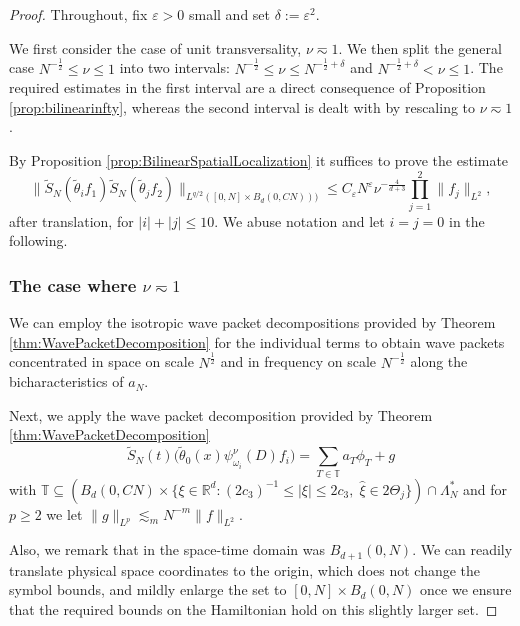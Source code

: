 \documentclass{amsart}
\numberwithin{equation}{section}
\theoremstyle{definition}
\newcommand{\R}{\mathbb{R}}
\newcommand{\T}{\mathbb{T}}
\newcommand {\veps}{\varepsilon}
\begin{document}
\begin{proof}
Throughout, fix $\veps>0$ small and set $\delta:=\veps^{2}$. 

We first consider the case of unit transversality, $\nu\eqsim 1$. We then split the general case $N^{-\frac{1}{2}}\leq \nu\leq 1$ into two intervals: $N^{-\frac{1}{2}}\leq \nu\leq N^{-\frac{1}{2}+\delta}$ and $N^{-\frac{1}{2}+\delta}<\nu\leq 1$. The required estimates in the first interval are a direct consequence of Proposition \ref{prop:bilinearinfty}, whereas the second interval is dealt with by rescaling to $\nu\eqsim 1$.

By Proposition \ref{prop:BilinearSpatialLocalization} it suffices to prove the estimate
\begin{equation*}
    \| \tilde{S}_N (\tilde{\theta}_i f_1) \tilde{S}_N (\tilde{\theta}_j f_2) \|_{L^{q/2}([0,N] \times B_d(0,CN)))} \leq C_\varepsilon N^{\varepsilon} \nu^{-\frac{4}{d+3}} \prod_{j=1}^2 \| f_j \|_{L^2},
\end{equation*}
after translation, for $|i|+|j| \leq 10$. We abuse notation and let $i=j=0$ in the following.

\subsubsection*{The case where $\nu \eqsim 1$} 
We can employ the isotropic wave packet decompositions provided by Theorem \ref{thm:WavePacketDecomposition} for the individual terms to obtain wave packets concentrated in space on scale $N^{\frac{1}{2}}$ and in frequency on scale $N^{-\frac{1}{2}}$ along the bicharacteristics of $a_N$.

Next, we apply the wave packet decomposition provided by Theorem \ref{thm:WavePacketDecomposition}
\begin{equation*}
\tilde{S}_N(t) \big( \tilde{\theta}_0(x) \psi^{\nu}_{\omega_{i}}(D) f_i \big) = \sum_{T \in \T} a_T \phi_T + g
\end{equation*}
with $\T \subseteq ( B_d(0,CN) \times \{ \xi \in \R^d: (2c_{3})^{-1}\leq |\xi|\leq 2c_{3}, \; \hat{\xi}\in 2\Theta_{j} \} ) \cap \Lambda_N^*$ and for $p \geq 2$ we let $\| g \|_{L^p} \lesssim_m N^{-m} \| f \|_{L^2}$.

Also, we remark that in \cite{SchippaTataru2025} the space-time domain was $B_{d+1}(0,N)$. We can readily translate physical space coordinates to the origin, which does not change the symbol bounds, and mildly enlarge the set to $[0,N] \times B_d(0,N)$ once we ensure that the required bounds on the Hamiltonian hold on this slightly larger set.


\end{proof}
\end{document}
